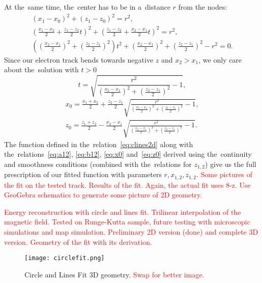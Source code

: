 		At the~same time, the~center has to be in a~distance $r$ from the nodes:
			\begin{gather}
				(x_1-x_0)^2 + (z_1-z_0)^2 = r^2,\\
				\left(\frac{x_1-x_2}{2}+\frac{z_1-z_2}{2}t\right)^2 + \left(\frac{z_1-z_2}{2}+\frac{x_2-x_1}{2}t\right)^2 = r^2,\\
				\left(\left(\frac{x_2-x_1}{2}\right)^2+\left(\frac{z_2-z_1}{2}\right)^2\right)t^2+\left(\frac{x_2-x_1}{2}\right)^2+\left(\frac{z_2-z_1}{2}\right)^2-r^2=0.
			\end{gather}
		Since our electron track bends towards negative $z$ and $x_2 > x_1$, we only care about the~solution with $t>0$
			\begin{equation}
				t = \sqrt{\frac{r^2}{\left(\frac{x_2-x_1}{2}\right)^2+\left(\frac{z_2-z_1}{2}\right)^2}-1},
			\end{equation}
			\begin{align}
				x_0 = \frac{x_1+x_2}{2} + \frac{z_2-z_1}{2} \sqrt{\frac{r^2}{\left(\frac{x_2-x_1}{2}\right)^2+\left(\frac{z_2-z_1}{2}\right)^2}-1},\label{eq:x0}\\
				z_0 = \frac{z_1+z_2}{2} - \frac{x_2-x_1}{2} \sqrt{\frac{r^2}{\left(\frac{x_2-x_1}{2}\right)^2+\left(\frac{z_2-z_1}{2}\right)^2}-1}.\label{eq:z0}
			\end{align}
		The function defined in the~relation~\ref{eq:clines2d} along with the~relations~\ref{eq:a12}, \ref{eq:b12}, \ref{eq:x0} and~\ref{eq:z0} derived using the~continuity and smoothness conditions (combined with the~relations for $z_{1,2}$) give us the full prescription of our fitted function with parameters $r,x_{1,2},z_{1,2}$. \textcolor{red}{Some pictures of the fit on the tested track. Results of the fit. Again, the actual fit uses 8-z. Use GeoGebra schematics to generate some picture of 2D geometry.}
		
		\textcolor{red}{Energy reconstruction with circle and lines fit. Trilinear interpolation of the magnetic field. Tested on Runge-Kutta sample, future testing with microscopic simulations and map simulation. Preliminary 2D version (done) and complete 3D version. Geometry of the fit with its derivation.}
		
		\begin{figure}
			\centering
			\texttt{[image: circlefit.png]}
			\caption{Circle and Lines Fit 3D geometry. \textcolor{red}{Swap for better image.}}
			\label{fig:circlefit}
		\end{figure}
		
